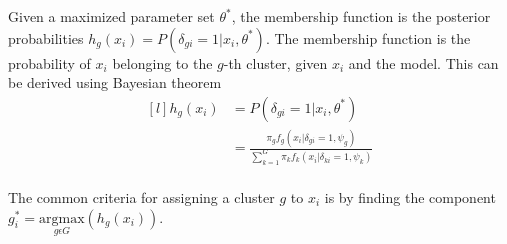 Given a maximized parameter set \(\theta^*\), the membership function is the posterior probabilities \(h_g(x_i)=P(\delta_{gi}=1|x_i,\theta^*)\). The membership function is the probability of \(x_i\) belonging to the \(g\)-th cluster, given \(x_i\) and the model. This can be derived using Bayesian theorem 
\[\begin{matrix*}[l]
    h_g(x_i)& = P(\delta_{gi}=1|x_i,\theta^*) \\ 
            & = \frac{\pi_gf_g(x_i|\delta_{gi}=1,\psi_g)}{\sum_{k=1}^{G}\pi_kf_k(x_i|\delta_{ki}=1,\psi_k)}\\ 
    \end{matrix*}\]

The common criteria for assigning a cluster \(g\) to \(x_i\) is by finding the component \(g_i^*=\underset{g\epsilon G}{\mathrm{argmax}}(h_{g}(x_i))\).


